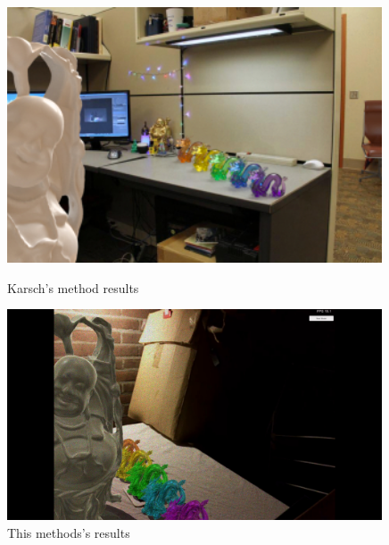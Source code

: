 \begin{figure}[H]
    \centering
    \begin{minipage}{0.5\textwidth}
        \centering
        \includegraphics[width=0.99\textwidth]{Figures/budaDragonKarsch.png} %
        \caption{Karsch's method results}
    \end{minipage}\hfill
    \begin{minipage}{0.5\textwidth}
        \centering
        \includegraphics[width=0.99\textwidth]{Figures/budaDragon.png} %
        \caption{This methods's results}
    \end{minipage}
\end{figure}


